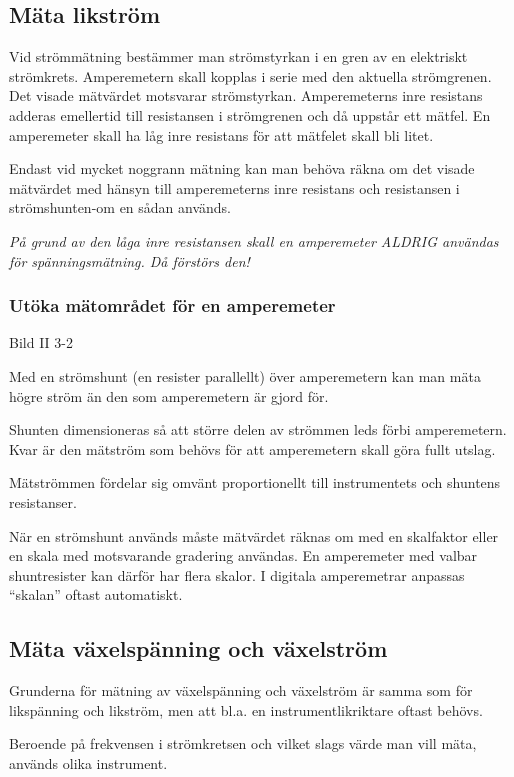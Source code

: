 \subsection{Mäta likström}

Vid strömmätning bestämmer man strömstyrkan i en gren av en elektriskt
strömkrets.  Amperemetern skall kopplas i serie med den aktuella
strömgrenen.  Det visade mätvärdet motsvarar strömstyrkan.
Amperemeterns inre resistans adderas emellertid till resistansen i
strömgrenen och då uppstår ett mätfel.  En amperemeter skall ha låg
inre resistans för att mätfelet skall bli litet.

Endast vid mycket noggrann mätning kan man behöva räkna om det visade
mätvärdet med hänsyn till amperemeterns inre resistans och resistansen
i strömshunten-om en sådan används.

\emph{På grund av den låga inre resistansen skall en amperemeter
  ALDRIG användas för spänningsmätning. Då förstörs den!}

\subsubsection{Utöka mätområdet för en amperemeter}

Bild II 3-2

Med en strömshunt (en resister parallellt) över amperemetern kan man
mäta högre ström än den som amperemetern är gjord för.

Shunten dimensioneras så att större delen av strömmen leds förbi
amperemetern.  Kvar är den mätström som behövs för att amperemetern
skall göra fullt utslag.

Mätströmmen fördelar sig omvänt proportionellt till instrumentets och
shuntens resistanser.

När en strömshunt används måste mätvärdet räknas om med en skalfaktor
eller en skala med motsvarande gradering användas. En amperemeter med
valbar shuntresister kan därför har flera skalor. I digitala
amperemetrar anpassas ``skalan'' oftast automatiskt.

\subsection{Mäta växelspänning och växelström}

Grunderna för mätning av växelspänning och växelström är samma som för
likspänning och likström, men att bl.a. en instrumentlikriktare oftast
behövs.

Beroende på frekvensen i strömkretsen och vilket slags värde man vill
mäta, används olika instrument.

